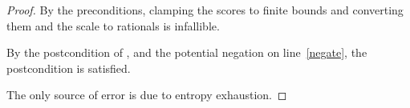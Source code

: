 \documentclass{article}
\begin{document}
\begin{proof}
    By the preconditions, clamping the scores to finite bounds and converting them and the scale to rationals is infallible.

    By the postcondition of ,
    and the potential negation on line~\ref{negate},
    the postcondition is satisfied.

    The only source of error is due to entropy exhaustion.
\end{proof}
\end{document}

